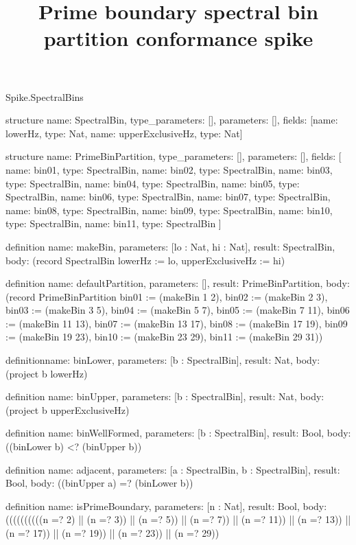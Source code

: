 \begin{lexlean}{Spike.SpectralBins}
\title{Prime boundary spectral bin partition conformance spike}
\begin{semanticmodule}
structure{
  name: SpectralBin,
  type_parameters: [],
  parameters: [],
  fields: [{name: lowerHz, type: Nat}, {name: upperExclusiveHz, type: Nat}]
}

structure{
  name: PrimeBinPartition,
  type_parameters: [],
  parameters: [],
  fields: [
    {name: bin01, type: SpectralBin},
    {name: bin02, type: SpectralBin},
    {name: bin03, type: SpectralBin},
    {name: bin04, type: SpectralBin},
    {name: bin05, type: SpectralBin},
    {name: bin06, type: SpectralBin},
    {name: bin07, type: SpectralBin},
    {name: bin08, type: SpectralBin},
    {name: bin09, type: SpectralBin},
    {name: bin10, type: SpectralBin},
    {name: bin11, type: SpectralBin}
  ]
}

definition{
  name: makeBin,
  parameters: [lo : Nat, hi : Nat],
  result: SpectralBin,
  body: (record SpectralBin {lowerHz := lo, upperExclusiveHz := hi})
}

definition{
  name: defaultPartition,
  parameters: [],
  result: PrimeBinPartition,
  body: (record PrimeBinPartition {bin01 := (makeBin 1 2), bin02 := (makeBin 2 3), bin03 := (makeBin 3 5), bin04 := (makeBin 5 7), bin05 := (makeBin 7 11), bin06 := (makeBin 11 13), bin07 := (makeBin 13 17), bin08 := (makeBin 17 19), bin09 := (makeBin 19 23), bin10 := (makeBin 23 29), bin11 := (makeBin 29 31)})
}

definition{name: binLower, parameters: [b : SpectralBin], result: Nat, body: (project b lowerHz)}

definition{
  name: binUpper,
  parameters: [b : SpectralBin],
  result: Nat,
  body: (project b upperExclusiveHz)
}

definition{
  name: binWellFormed,
  parameters: [b : SpectralBin],
  result: Bool,
  body: ((binLower b) <? (binUpper b))
}

definition{
  name: adjacent,
  parameters: [a : SpectralBin, b : SpectralBin],
  result: Bool,
  body: ((binUpper a) =? (binLower b))
}

definition{
  name: isPrimeBoundary,
  parameters: [n : Nat],
  result: Bool,
  body: ((((((((((n =? 2) || (n =? 3)) || (n =? 5)) || (n =? 7)) || (n =? 11)) || (n =? 13)) || (n =? 17)) || (n =? 19)) || (n =? 23)) || (n =? 29))
}


\end{semanticmodule}
\end{lexlean}
